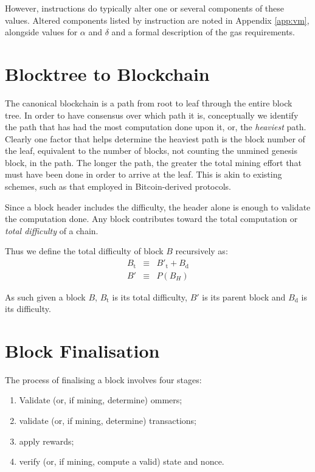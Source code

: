 \documentclass[9pt,oneside]{amsart}
\begin{document}
\begin{multicols}{2}
However, instructions do typically alter one or several components of these values. Altered components listed by instruction are noted in Appendix \ref{app:vm}, alongside values for $\alpha$ and $\delta$ and a formal description of the gas requirements.

\section{Blocktree to Blockchain} \label{ch:ghost}

The canonical blockchain is a path from root to leaf through the entire block tree. In order to have consensus over which path it is, conceptually we identify the path that has had the most computation done upon it, or, the \textit{heaviest} path. Clearly one factor that helps determine the heaviest path is the block number of the leaf, equivalent to the number of blocks, not counting the unmined genesis block, in the path. The longer the path, the greater the total mining effort that must have been done in order to arrive at the leaf. This is akin to existing schemes, such as that employed in Bitcoin-derived protocols.

Since a block header includes the difficulty, the header alone is enough to validate the computation done. Any block contributes toward the total computation or \textit{total difficulty} of a chain.

Thus we define the total difficulty of block $B$ recursively as:
\begin{eqnarray}
B_{\mathrm{t}} & \equiv & B'_{\mathrm{t}} + B_{\mathrm{d}} \\
B' & \equiv & P(B_{H})
\end{eqnarray}

As such given a block $B$, $B_{\mathrm{t}}$ is its total difficulty, $B'$ is its parent block and $B_{\mathrm{d}}$ is its difficulty.

\section{Block Finalisation} \label{ch:finalisation}

The process of finalising a block involves four stages:

\begin{enumerate}
\item Validate (or, if mining, determine) ommers;
\item validate (or, if mining, determine) transactions;
\item apply rewards;
\item verify (or, if mining, compute a valid) state and nonce.
\end{enumerate}


\end{multicols}
\end{document}
